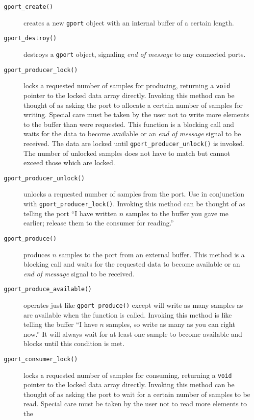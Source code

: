 \begin{description}
\item[{\tt gport\_create()}]
    creates a new {\tt gport} object with an internal buffer of a certain
    length.
\item[{\tt gport\_destroy()}]
    destroys a {\tt gport} object, signaling {\it end of message} to any
    connected ports.
\item[{\tt gport\_producer\_lock()}]
    locks a requested number of samples for producing, returning a {\tt void}
    pointer to the locked data array directly.
    Invoking this method can be thought of as asking the port to allocate a
    certain number of samples for writing.
    Special care must be taken by the user not to write more elements to the
    buffer than were requested.
    This function is a blocking call and waits for the data to become
    available or an {\it end of message} signal to be received.
    The data are locked until {\tt gport\_producer\_unlock()} is invoked.
    The number of unlocked samples does not have to match but cannot exceed
    those which are locked.
\item[{\tt gport\_producer\_unlock()}]
    unlocks a requested number of samples from the port.
    Use in conjunction with {\tt gport\_producer\_lock()}.
    Invoking this method can be thought of as telling the port ``I have
    written $n$ samples to the buffer you gave me earlier; release them to the
    consumer for reading.''
\item[{\tt gport\_produce()}]
    produces $n$ samples to the port from an external buffer.
    This method is a blocking call and waits for the requested data to become
    available or an {\it end of message} signal to be received.
\item[{\tt gport\_produce\_available()}]
    operates just like {\tt gport\_produce()} except will write as many
    samples as are available when the function is called.
    Invoking this method is like telling the buffer ``I have $n$ samples, so
    write as many as you can right now.''
    It will always wait for at least one sample to become available and blocks
    until this condition is met.
\item[{\tt gport\_consumer\_lock()}]
    locks a requested number of samples for consuming, returning a {\tt void}
    pointer to the locked data array directly.
    Invoking this method can be thought of as asking the port to wait for a
    certain number of samples to be read.
    Special care must be taken by the user not to read more elements to the

\end{description}

